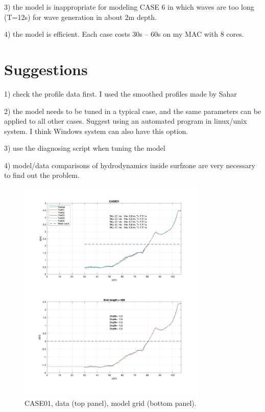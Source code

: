 \documentclass[preprint,10pt]{elsarticle}
\begin{document}
3) the model is inappropriate for modeling CASE 6 in which waves are too long (T=12s) for wave generation in about 2m depth.  

4) the model is efficient. Each case costs 30s -- 60s on my MAC with 8 cores. 

\section*{Suggestions}  

1) check the profile data first. I used the smoothed profiles made by Sahar

2) the model needs to be tuned in a typical case, and the same parameters can be applied to all other cases. Suggest using an automated program in linux/unix system. I think Windows system can also have this option. 

3) use the diagnosing script when tuning the model

4) model/data comparisons of hydrodynamics inside surfzone are very necessary to find out the problem.  


\newpage

 \begin{figure}
\begin{center}
 \includegraphics[width=0.8\textwidth]{../data/preprocessing/plots/CASE01.jpg}
 \caption{CASE01, data (top panel), model grid (bottom panel).}
 \label{lineargrid}
 \end{center}
 \end{figure}
 
\end{document}
